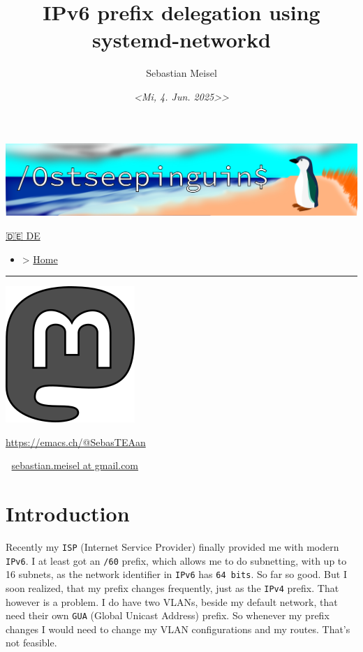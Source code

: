 \documentclass[11pt]{article}
\author{Sebastian Meisel}
\date{\textit{<Mi,  4. Jun. 2025>>}}
\title{IPv6 prefix delegation using systemd-networkd}
\newenvironment{menu}{}{}
\begin{document}
\maketitle

\begin{center}
	\includegraphics[width=.65\linewidth]{img/Ostseepinguin.png}
\end{center}


\begin{menu}
	\href{NetworkNamespace.DE.html}{🇩🇪 DE}
	\begin{itemize}
		\item > \href{index.html}{Home}
	\end{itemize}

	\noindent\rule{\textwidth}{0.5pt}
	\begin{center}
		\includegraphics[width=.65\linewidth]{img/Mastodon.png}
	\end{center} \url{https://emacs.ch/@SebasTEAan}

	📧 \href{mailto:sebastian.meisel+ostseepinguin@gmail.com}{sebastian.meisel at gmail.com}
\end{menu}

\section*{Introduction}
\label{sec:orgb6dc759}

Recently my \texttt{ISP} (Internet Service Provider) finally provided me with modern \texttt{IPv6}. I at least got an \texttt{/60} prefix, which allows me to do subnetting, with up to 16 subnets, as the network identifier in \texttt{IPv6} has \texttt{64 bits}. So far so good. But I soon realized, that my prefix changes frequently, just as the \texttt{IPv4} prefix. That however is a problem. I do have two VLANs, beside my default network, that need their own \texttt{GUA} (Global Unicast Address) prefix. So whenever my prefix changes I would need to change my VLAN configurations and my routes. That's not feasible.
\end{document}
